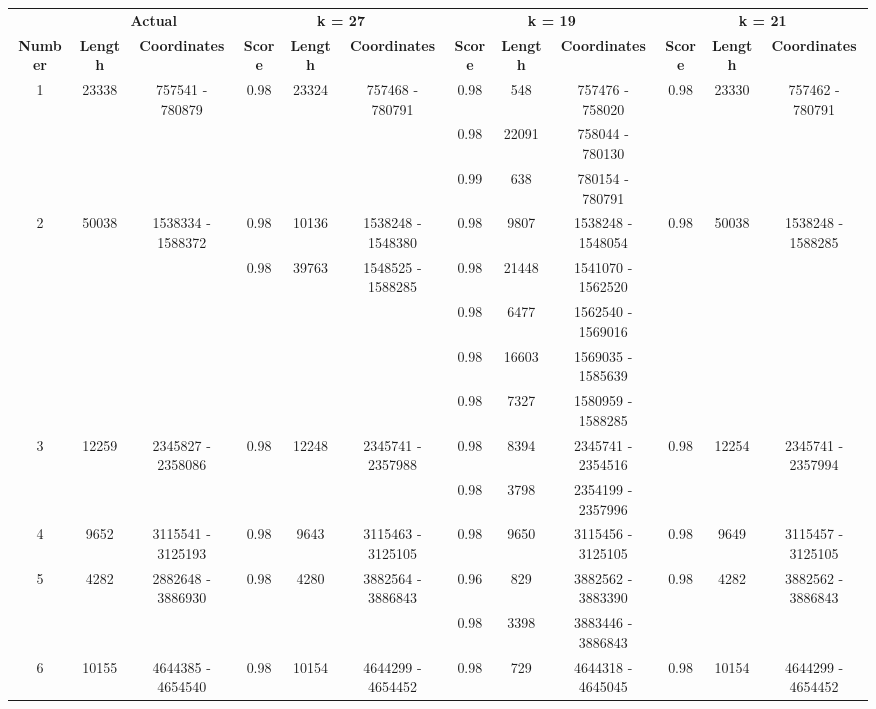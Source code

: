 \documentclass[a4paper,10pt]{article}
\begin{document}
\begin{landscape}
\mbox{}\vfill
\begin{table}[!h]
\renewcommand{\arraystretch}{1.2}
\centering
\begin{tabular}{| c | c c | c c c | c c c | c c c |}
  \cline{1-12}
  & \multicolumn{2}{c|}{\textbf{Actual}} & \multicolumn{3}{c|}{\textbf{k = 27}} & \multicolumn{3}{c|}{\textbf{k = 19}} & \multicolumn{3}{c|}{\textbf{k = 21}} \\
  \cline{2-4} \cline{4-6} \cline{7-9} \cline{10-12}
  \textbf{Number} & \textbf{Length} & \textbf{Coordinates} & \textbf{Score} & \textbf{Length} & \textbf{Coordinates} & \textbf{Score} & \textbf{Length} & \textbf{Coordinates} & \textbf{Score} & \textbf{Length} & \textbf{Coordinates} \\ \cline{1-12}
  1 & 23338 & 757541 - 780879 & 0.98 & 23324 & 757468 - 780791 & 0.98 & 548 & 757476 - 758020 & 0.98 & 23330 & 757462 - 780791 \\
  & & & & & & 0.98 & 22091 & 758044 - 780130 & & & \\
  & & & & & & 0.99 & 638 & 780154 - 780791 & & & \\ \cline{1-12}
  2 & 50038 & 1538334 - 1588372 & 0.98 & 10136 & 1538248 - 1548380 & 0.98 & 9807 & 1538248 - 1548054 & 0.98 & 50038 & 1538248 - 1588285 \\
  & & & 0.98 & 39763 & 1548525 - 1588285 & 0.98 & 21448 & 1541070 - 1562520 & & & \\
  & & & & & & 0.98 & 6477 & 1562540 - 1569016 & & & \\
  & & & & & & 0.98 & 16603 & 1569035 - 1585639 & & & \\
  & & & & & & 0.98 & 7327 & 1580959 - 1588285 & & & \\ \cline{1-12}
  3 & 12259 & 2345827 - 2358086 & 0.98 & 12248 & 2345741 - 2357988 & 0.98 & 8394 & 2345741 - 2354516 & 0.98 & 12254 & 2345741 - 2357994 \\
  & & & & & & 0.98 & 3798 & 2354199 - 2357996 & & & \\ \cline{1-12}
  4 & 9652 & 3115541 - 3125193 & 0.98 & 9643 & 3115463 - 3125105 & 0.98 & 9650 & 3115456 - 3125105 & 0.98 & 9649 & 3115457 - 3125105 \\ \cline{1-12}
  5 & 4282 & 2882648 - 3886930 & 0.98 & 4280 & 3882564 - 3886843 & 0.96 & 829 & 3882562 - 3883390 & 0.98 & 4282 & 3882562 - 3886843 \\
  & & & & & & 0.98 & 3398 & 3883446 - 3886843 & & & \\ \cline{1-12}
  6 & 10155 & 4644385 - 4654540 & 0.98 & 10154 & 4644299 - 4654452 & 0.98 & 729 & 4644318 - 4645045 & 0.98 & 10154 & 4644299 - 4654452 \\

\end{tabular}
\end{table}
\end{landscape}
\end{document}
